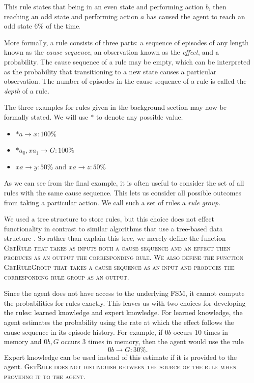 \documentclass[letterpaper]{article} %
\begin{document}
This rule states that being in an even state and performing action
$b$, then reaching an odd state and performing action $a$ has caused
the agent to reach an odd state $6\%$ of the time.


More formally, a rule consists of three parts: a sequence of episodes of any length known as the \emph{cause sequence}, an observation known as the \emph{effect}, and a probability. The cause sequence of a rule may be empty, which can be interpreted as the probability  that transitioning to a new state causes a particular observation. The number of episodes in the cause sequence of a rule is called the \textit{depth} of a rule.

The three examples for rules given in the background section may now be formally stated. We will use $*$ to denote any possible value.
\begin{itemize}
	\item $*a \rightarrow x: 100\%$
	\item $*a_0, xa_1 \rightarrow G: 100\%$
	\item $xa \rightarrow y: 50\%$ and $xa \rightarrow z: 50\%$
\end{itemize}

As we can see from the final example, it is often useful to consider
the set of all rules with the same cause sequence. This lets us
consider all possible outcomes from taking a particular action. We
call such a set of rules a \textit{rule group}.

We used a tree structure to store rules, but this choice does not
effect functionality in contrast to similar algorithms that use a
tree-based data structure \cite{McCallumUSM95,Shani2005}. So rather
than explain this tree, we merely define the function \scshape
GetRule \normalfont that takes as inputs both a cause sequence and an
effect then produces as an output the corresponding rule. We also
define the function \scshape GetRuleGroup \normalfont that takes a
cause sequence as an input and produces the corresponding rule group
as an output.

Since the agent does not have access to the underlying FSM, it cannot
compute the probabilities for rules exactly. This leaves us with two
choices for developing the rules: learned knowledge and expert
knowledge. For learned knowledge, the agent estimates the probability
using the rate at which the effect follows the cause sequence in its
episode history. For example, if $0b$ occurs $10$ times in memory and
$0b,G$ occurs $3$ times in memory, then the agent would use the
rule $$0b \rightarrow G: 30\%.$$ Expert knowledge can be used instead
of this estimate if it is provided to the agent. \scshape
GetRule \normalfont does not distinguish between the source of the
rule when providing it to the agent.
\end{document}
